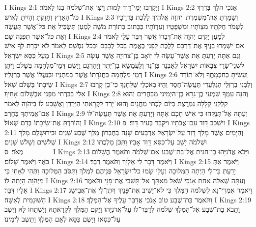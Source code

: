 I Kings 2:1	וַיִּקְרְבוּ יְמֵי־דָוִד לָמוּת וַיְצַו אֶת־שְׁלֹמֹה בְנוֹ לֵאמֹר׃
I Kings 2:2	אָנֹכִי הֹלֵךְ בְּדֶרֶךְ כּל־הָאָרֶץ וְחָזַקְתָּ וְהָיִיתָ לְאִישׁ׃
I Kings 2:3	וְשָׁמַרְתָּ אֶת־מִשְׁמֶרֶת  יְהֹוָה אֱלֹהֶיךָ לָלֶכֶת בִּדְרָכָיו לִשְׁמֹר חֻקֹּתָיו מִצְוֺתָיו וּמִשְׁפָּטָיו וְעֵדְוֺתָיו כַּכָּתוּב בְּתוֹרַת מֹשֶׁה לְמַעַן תַּשְׂכִּיל אֵת כּל־אֲשֶׁר תַּעֲשֶׂה וְאֵת כּל־אֲשֶׁר תִּפְנֶה שָׁם׃
I Kings 2:4	לְמַעַן יָקִים יְהֹוָה אֶת־דְּבָרוֹ אֲשֶׁר דִּבֶּר עָלַי לֵאמֹר אִם־יִשְׁמְרוּ בָנֶיךָ אֶת־דַּרְכָּם לָלֶכֶת לְפָנַי בֶּאֱמֶת בְּכל־לְבָבָם וּבְכל־נַפְשָׁם לֵאמֹר לֹא־יִכָּרֵת לְךָ אִישׁ מֵעַל כִּסֵּא יִשְׂרָאֵל׃
I Kings 2:5	וְגַם אַתָּה יָדַעְתָּ אֵת אֲשֶׁר־עָשָׂה לִי יוֹאָב בֶּן־צְרוּיָה אֲשֶׁר עָשָׂה לִשְׁנֵי־שָׂרֵי צִבְאוֹת יִשְׂרָאֵל לְאַבְנֵר בֶּן־נֵר וְלַעֲמָשָׂא בֶן־יֶתֶר וַיַּהַרְגֵם וַיָּשֶׂם דְּמֵי־מִלְחָמָה בְּשָׁלֹם וַיִּתֵּן דְּמֵי מִלְחָמָה בַּחֲגֹרָתוֹ אֲשֶׁר בְּמתְנָיו וּבְנַעֲלוֹ אֲשֶׁר בְּרַגְלָיו׃
I Kings 2:6	וְעָשִׂיתָ כְּחכְמָתֶךָ וְלֹא־תוֹרֵד שֵׂיבָתוֹ בְּשָׁלֹם שְׁאֹל׃
I Kings 2:7	וְלִבְנֵי בַרְזִלַּי הַגִּלְעָדִי תַּעֲשֶׂה־חֶסֶד וְהָיוּ בְּאֹכְלֵי שֻׁלְחָנֶךָ כִּי־כֵן קָרְבוּ אֵלַי בְּברְחִי מִפְּנֵי אַבְשָׁלוֹם אָחִיךָ׃
I Kings 2:8	וְהִנֵּה עִמְּךָ שִׁמְעִי בֶן־גֵּרָא בֶן־הַיְמִינִי מִבַּחֻרִים וְהוּא קִלְלַנִי קְלָלָה נִמְרֶצֶת בְּיוֹם לֶכְתִּי מַחֲנָיִם וְהוּא־יָרַד לִקְרָאתִי הַיַּרְדֵּן וָאֶשָּׁבַע לוֹ בַיהֹוָה לֵאמֹר אִם־אֲמִיתְךָ בֶּחָרֶב׃
I Kings 2:9	וְעַתָּה אַל־תְּנַקֵּהוּ כִּי אִישׁ חָכָם אָתָּה וְיָדַעְתָּ אֵת אֲשֶׁר תַּעֲשֶׂה־לּוֹ וְהוֹרַדְתָּ אֶת־שֵׂיבָתוֹ בְּדָם שְׁאוֹל׃
I Kings 2:10	וַיִּשְׁכַּב דָּוִד עִם־אֲבֹתָיו וַיִּקָּבֵר בְּעִיר דָּוִד׃ {פ}
I Kings 2:11	וְהַיָּמִים אֲשֶׁר מָלַךְ דָּוִד עַל־יִשְׂרָאֵל אַרְבָּעִים שָׁנָה בְּחֶבְרוֹן מָלַךְ שֶׁבַע שָׁנִים וּבִירוּשָׁלַ͏ִם מָלַךְ שְׁלֹשִׁים וְשָׁלֹשׁ שָׁנִים׃
I Kings 2:12	וּשְׁלֹמֹה יָשַׁב עַל־כִּסֵּא דָּוִד אָבִיו וַתִּכֹּן מַלְכֻתוֹ מְאֹד׃ {ס}        
I Kings 2:13	וַיָּבֹא אֲדֹנִיָּהוּ בֶן־חַגִּית אֶל־בַּת־שֶׁבַע אֵם־שְׁלֹמֹה וַתֹּאמֶר הֲשָׁלוֹם בֹּאֶךָ וַיֹּאמֶר שָׁלוֹם׃
I Kings 2:14	וַיֹּאמֶר דָּבָר לִי אֵלָיִךְ וַתֹּאמֶר דַּבֵּר׃
I Kings 2:15	וַיֹּאמֶר אַתְּ יָדַעַתְּ כִּי־לִי הָיְתָה הַמְּלוּכָה וְעָלַי שָׂמוּ כל־יִשְׂרָאֵל פְּנֵיהֶם לִמְלֹךְ וַתִּסֹּב הַמְּלוּכָה וַתְּהִי לְאָחִי כִּי מֵיְהֹוָה הָיְתָה לּוֹ׃
I Kings 2:16	וְעַתָּה שְׁאֵלָה אַחַת אָנֹכִי שֹׁאֵל מֵאִתָּךְ אַל־תָּשִׁבִי אֶת־פָּנָי וַתֹּאמֶר אֵלָיו דַּבֵּר׃
I Kings 2:17	וַיֹּאמֶר אִמְרִי־נָא לִשְׁלֹמֹה הַמֶּלֶךְ כִּי לֹא־יָשִׁיב אֶת־פָּנָיִךְ וְיִתֶּן־לִי אֶת־אֲבִישַׁג הַשּׁוּנַמִּית לְאִשָּׁה׃
I Kings 2:18	וַתֹּאמֶר בַּת־שֶׁבַע טוֹב אָנֹכִי אֲדַבֵּר עָלֶיךָ אֶל־הַמֶּלֶךְ׃
I Kings 2:19	וַתָּבֹא בַת־שֶׁבַע אֶל־הַמֶּלֶךְ שְׁלֹמֹה לְדַבֶּר־לוֹ עַל־אֲדֹנִיָּהוּ וַיָּקם הַמֶּלֶךְ לִקְרָאתָהּ וַיִּשְׁתַּחוּ לָהּ וַיֵּשֶׁב עַל־כִּסְאוֹ וַיָּשֶׂם כִּסֵּא לְאֵם הַמֶּלֶךְ וַתֵּשֶׁב לִימִינוֹ׃

